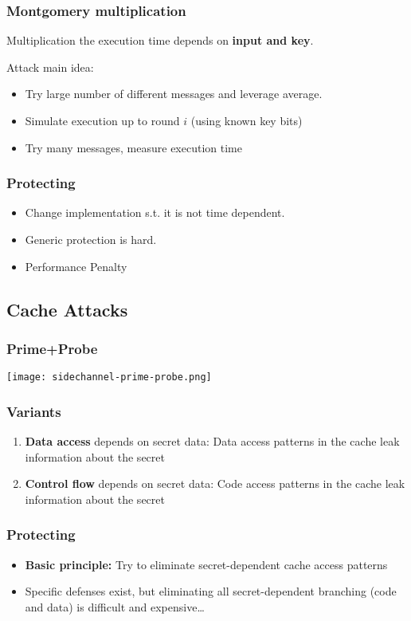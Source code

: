 \subsubsection{Montgomery multiplication}
Multiplication the execution time depends on \textbf{input and key}.

Attack main idea:
\begin{itemize}
  \item Try large number of different messages and leverage average.
  \item Simulate execution up to round $i$ (using known key bits)
  \item Try many messages, measure execution time
\end{itemize}

\subsubsection{Protecting}
\begin{itemize}
  \item Change implementation s.t. it is not time dependent.
  \item Generic protection is hard.
  \item Performance Penalty
\end{itemize}

\subsection{Cache Attacks}
\subsubsection{Prime+Probe}
\texttt{[image: sidechannel-prime-probe.png]}
\subsubsection{Variants}
\begin{enumerate}
	\item \textbf{Data access} depends on secret data: Data access patterns
	  in the cache leak information about the secret
	\item \textbf{Control flow} depends on secret data: Code access
	  patterns in the cache leak information about the secret
\end{enumerate}
\subsubsection{Protecting}
\begin{itemize}
	\item \textbf{Basic principle:}
Try to eliminate secret-dependent cache access patterns
\item Specific defenses exist, but eliminating all secret-dependent
branching (code and data) is difficult and expensive…
\end{itemize}

